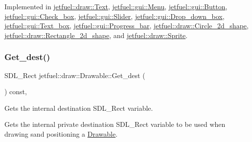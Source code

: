 Implemented in \hyperlink{classjetfuel_1_1draw_1_1Text_ac0b8a614277d6b575c52d127e9a673f2}{jetfuel\+::draw\+::\+Text}, \hyperlink{classjetfuel_1_1gui_1_1Menu_a0355f5ee3060b1ae9d85a5c8cba3795b}{jetfuel\+::gui\+::\+Menu}, \hyperlink{classjetfuel_1_1gui_1_1Button_a1c8ec68b90dc461b1603c47fb8c509c4}{jetfuel\+::gui\+::\+Button}, \hyperlink{classjetfuel_1_1gui_1_1Check__box_ad2ce6d4af8d950a4ef76b0688541c29a}{jetfuel\+::gui\+::\+Check\+\_\+box}, \hyperlink{classjetfuel_1_1gui_1_1Slider_a483038c689276ed8468e990977e5a74a}{jetfuel\+::gui\+::\+Slider}, \hyperlink{classjetfuel_1_1gui_1_1Drop__down__box_a1b62cab3674f45700ad9afd6076a8cb1}{jetfuel\+::gui\+::\+Drop\+\_\+down\+\_\+box}, \hyperlink{classjetfuel_1_1gui_1_1Text__box_add6b8b170d66e4f6ee3c5878906bd2d1}{jetfuel\+::gui\+::\+Text\+\_\+box}, \hyperlink{classjetfuel_1_1gui_1_1Progress__bar_a91a7ffe82738105be9b36a48dca1cdec}{jetfuel\+::gui\+::\+Progress\+\_\+bar}, \hyperlink{classjetfuel_1_1draw_1_1Circle__2d__shape_a8be660f3cd624dc077d9003ee3b37212}{jetfuel\+::draw\+::\+Circle\+\_\+2d\+\_\+shape}, \hyperlink{classjetfuel_1_1draw_1_1Rectangle__2d__shape_aba19e63d55c824de135932483fe40fcb}{jetfuel\+::draw\+::\+Rectangle\+\_\+2d\+\_\+shape}, and \hyperlink{classjetfuel_1_1draw_1_1Sprite_ae4e52cd12a067e67ed67d5a2a5835143}{jetfuel\+::draw\+::\+Sprite}.

\mbox{\label{classjetfuel_1_1draw_1_1Drawable_a8709fde1dc750d3c6ca5ecb8b9b4fb12}} 
\subsubsection{\texorpdfstring{Get\+\_\+dest()}{Get\_dest()}}
{\footnotesize\ttfamily S\+D\+L\+\_\+\+Rect jetfuel\+::draw\+::\+Drawable\+::\+Get\+\_\+dest (\begin{DoxyParamCaption}{ }\end{DoxyParamCaption}) const\hspace{0.3cm}{\ttfamily [inline]}, {\ttfamily [protected]}}



Gets the internal destination S\+D\+L\+\_\+\+Rect variable. 

Gets the internal private destination S\+D\+L\+\_\+\+Rect variable to be used when drawing sand positioning a \hyperlink{classjetfuel_1_1draw_1_1Drawable}{Drawable}. \mbox{\label{classjetfuel_1_1draw_1_1Drawable_ae7ebd30d66db2c8a5d5371cbcf0023fc}} 
